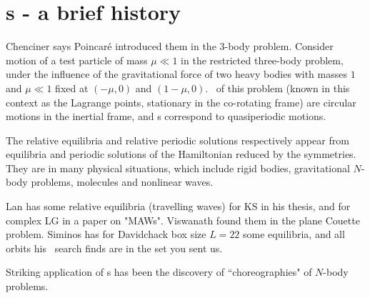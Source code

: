 %


\section{{\Rpo s} - a brief history}

Chenciner
says Poincar\'e introduced them in the 3-body problem.
Consider motion of a test particle of mass
$\mu \ll 1$ in the
restricted three-body problem,
under the
influence of the gravitational force of two heavy bodies with masses $1$ and
$\mu \ll 1$ fixed at $(-\mu,0)$ and $(1-\mu,0)$. \Reqv\ of this problem
(known in this context as the Lagrange points, stationary in
the co-rotating frame) are circular motions in the inertial frame,
and {\rpo s} correspond to quasiperiodic motions. 

The relative equilibria and relative periodic solutions 
respectively appear from
equilibria and periodic solutions of the Hamiltonian reduced by the symmetries.
They are in many physical situations, which include rigid bodies, gravitational
$N$-body problems, molecules and nonlinear waves.

Lan has some relative equilibria (travelling waves) for KS in his
thesis, %
 and for complex LG in a paper on "MAWs".
Viswanath %
found them in the plane Couette problem.
Siminos has for Davidchack box size $L=22$ some equilibria, and all
orbits his \rpo\ search finds are in the set you sent us.

Striking application of \rpo s has been the discovery
of ``choreographies" of $N$-body problems.



